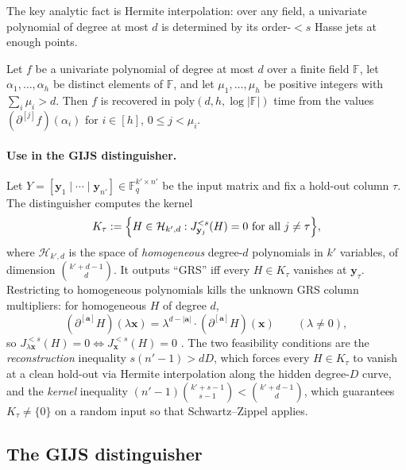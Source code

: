 The key analytic fact is Hermite interpolation: over any field, a univariate
polynomial of degree at most $d$ is determined by its order-$<s$ Hasse jets at
enough points.

\begin{lemma}
    Let $f$ be a univariate polynomial of degree at most $d$ over a finite
    field
    $\mathbb{F}$, let $\alpha_1,\dots,\alpha_h$ be distinct elements of
    $\mathbb{F}$, and let $\mu_1,\dots,\mu_h$ be positive integers with
    $\sum_i \mu_i > d$.  Then $f$ is recovered in
    $\mathrm{poly}(d,h,\log |\mathbb{F}|)$ time from the values
    $(\partial^{[j]} f)(\alpha_i)$ for $i \in [h]$, $0 \leq j < \mu_i$.
\end{lemma}

\paragraph{Use in the GIJS distinguisher.}
Let $Y = [\mathbf{y}_1 \mid \cdots \mid \mathbf{y}_{n'}] \in
    \mathbb{F}_q^{k' \times n'}$ be the input matrix and fix a hold-out column
$\tau$.  The distinguisher computes the kernel
\[
    K_\tau := \Bigl\{H \in \mathcal{H}_{k',d} :
    J_{\mathbf{y}_j}^{<s}(H) = 0 \text{ for all } j \neq \tau\Bigr\},
\]
where $\mathcal{H}_{k',d}$ is the space of \emph{homogeneous} degree-$d$
polynomials in $k'$ variables, of dimension $\binom{k'+d-1}{d}$.  It outputs
``GRS'' iff every $H \in K_\tau$ vanishes at $\mathbf{y}_\tau$.  Restricting
to homogeneous polynomials kills the unknown GRS column multipliers: for
homogeneous $H$ of degree $d$,
\[
    (\partial^{[\mathbf{a}]} H)(\lambda \mathbf{x})
    = \lambda^{d - |\mathbf{a}|} \cdot (\partial^{[\mathbf{a}]} H)(\mathbf{x})
    \qquad (\lambda \neq 0),
\]
so $J_{\lambda \mathbf{x}}^{<s}(H) = 0 \iff J_{\mathbf{x}}^{<s}(H) = 0$
\cite[Lem.~3.1]{GIJS26}.  The two feasibility conditions are the
\emph{reconstruction} inequality $s(n'-1) > dD$, which forces every
$H \in K_\tau$ to vanish at a clean hold-out via Hermite interpolation along
the hidden degree-$D$ curve, and the \emph{kernel} inequality
$(n'-1)\binom{k'+s-1}{s-1} < \binom{k'+d-1}{d}$, which guarantees
$K_\tau \neq \{0\}$ on a random input so that Schwartz--Zippel applies.


\subsection{The GIJS distinguisher}\label{sec:gijs-dist}



